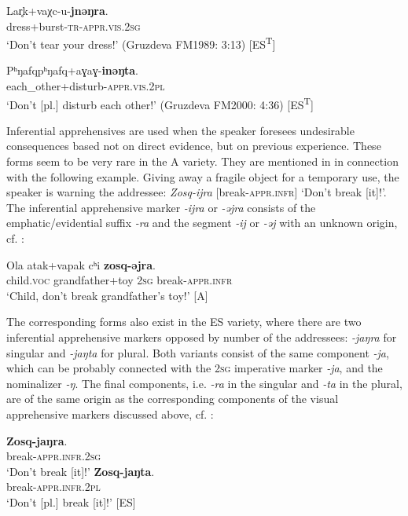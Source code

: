 \documentclass[output=paper,colorlinks,citecolor=brown]{langscibook}
\begin{document}
\ea\label{ex:niv:27}
    \gll Lar̥k+vaχc-u-\textbf{jnəŋra}. \\ 
         dress+burst-\textsc{tr}{}-\textsc{appr.vis.2sg} \\
    \glt ‘Don’t tear your dress!’ (Gruzdeva FM1989: 3:13) [ES\textsuperscript{T}]
\z 

\ea\label{ex:niv:28}
    \gll Pʰŋafqpʰŋafq+aɣaɣ-\textbf{inəŋta}. \\ 
         each\_other+disturb-\textsc{appr.vis.2pl} \\
    \glt ‘Don’t [pl.] disturb each other!’ (Gruzdeva FM2000: 4:36) [ES\textsuperscript{T}]
\z 

Inferential apprehensives are used when the speaker foresees undesirable consequences based not on direct evidence, but on previous experience. These forms seem to be very rare in the A variety. They are mentioned in \citep[316]{Kreinovich1979} in connection with the following example. Giving away a fragile object for a temporary use, the speaker is warning the addressee: \textit{Zosq-ijra} [break-\textsc{appr.infr}] ‘Don’t break [it]!’. The inferential apprehensive marker \textit{-ijra} or \textit{-əjra} consists of the emphatic/evidential suffix \textit{-ra} and the segment \textit{-ij} or \textit{-əj} with an unknown origin, cf. :


\ea\label{ex:niv:29}
    \gll Ola atak+vapak cʰi \textbf{zosq-əjra}. \\ 
         child.\textsc{voc} grandfather+toy 2\textsc{sg} break-\textsc{appr.infr} \\
    \glt ‘Child, don’t break grandfather’s toy!’ \citep[224]{Panfilov1965} [A]
\z

The corresponding forms also exist in the ES variety, where there are two inferential apprehensive markers opposed by number of the addressees: \textit{-jaŋra} for singular and \textit{-jaŋta} for plural. Both variants consist of the same component \textit{-ja}, which can be probably connected with the 2\textsc{sg} imperative marker \textit{-ja}, and the nominalizer \textit{-ŋ}. The final components, i.e. \textit{-ra} in the singular and \textit{-ta} in the plural, are of the same origin as the corresponding components of the visual apprehensive markers discussed above, cf. :

\ea\label{ex:niv:30}
    \ea\label{ex:niv:30a}
        \gll \textbf{Zosq-jaŋra}. \\ 
             break-\textsc{appr.infr.2sg} \\
        \glt ‘Don’t break [it]!’
    \ex\label{ex:niv:30b}
        \gll \textbf{Zosq-jaŋta}. \\
             break-\textsc{appr.infr.2pl}\\
        \glt ‘Don’t [pl.] break [it]!’ [ES]
    \z
\z
\end{document}
